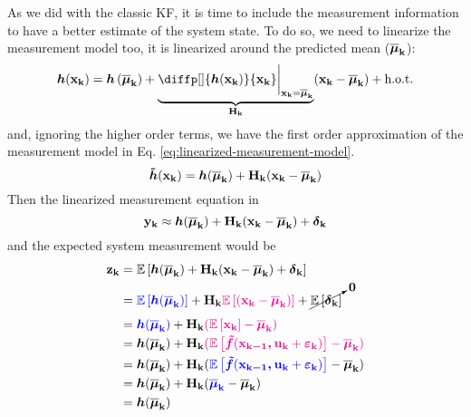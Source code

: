 \documentclass[12pt]{article}
\begin{document}
As we did with the classic KF, it is time to include the measurement information 
to have a better estimate of the system state. To do so, we need to linearize 
the measurement model too, it is linearized around the predicted mean 
($\boldsymbol{\mathbf{\overline{\mu}_k}}$):
\begin{equation*}
    \mb{h}(\bvec{x_k}) = \mb{h}\parentheses{\bvec{\overline{\mu}_k}} + 
    \underbrace{\diffp[]{\mb{h}(\bvec{x_k})}{\bvec{x_k}}
    \bigg\lvert_{\bvec{x_k}=\bvec{\overline{\mu}_k}}}_{\mat{H_k}}
    (\bvec{x_k} - \bvec{\overline{\mu}_k}) + \hot
\end{equation*}
and, ignoring the higher order terms, we have the first order approximation of the measurement model in Eq. \ref{eq:linearized-measurement-model}.
\begin{equation}
    {\boldsymbol{\tilde{h}}}(\boldsymbol{\mathbf{x_k}}) = {\boldsymbol{h}}(\boldsymbol{\mathbf{\overline{\mu}_k}}) + \boldsymbol{\mathbf{H_k}} (\boldsymbol{\mathbf{x_k}} - \boldsymbol{\mathbf{\overline{\mu}_k}})
    \label{eq:linearized-measurement-model} 
\end{equation}
Then the linearized measurement equation in
\begin{equation}
    \boldsymbol{\mathbf{y_k}} \approx {\boldsymbol{h}}(\boldsymbol{\mathbf{\overline{\mu}_k}}) + \boldsymbol{\mathbf{H_k}}(\boldsymbol{\mathbf{x_k}} - \boldsymbol{\mathbf{\overline{\mu}_k}}) + {\boldsymbol{\delta}}_\mathbf{k}
\end{equation}
and the expected system measurement would be
\begin{equation}
\begin{aligned}
    \boldsymbol{\mathbf{z_k}} &= \mathbb{E}\left[{\boldsymbol{h}}(\boldsymbol{\mathbf{\overline{\mu}_k}}) + \boldsymbol{\mathbf{H_k}}(\boldsymbol{\mathbf{x_k}} - \boldsymbol{\mathbf{\overline{\mu}_k}}) + {\boldsymbol{\delta}}_\mathbf{k}\right]\\
    &= \color{blue}\mathbb{E}\left[{\boldsymbol{h}}(\boldsymbol{\mathbf{\overline{\mu}_k}})\right]\color{black} + \boldsymbol{\mathbf{H_k}}\color{magenta}\mathbb{E}\left[(\boldsymbol{\mathbf{x_k}} - \boldsymbol{\mathbf{\overline{\mu}_k}})\right]\color{black} + \cancelto{\boldsymbol{\mathbf{0}}}{\mathbb{E}\left[{\boldsymbol{\delta}}_\mathbf{k}\right]}\\
    &= \color{blue}{\boldsymbol{h}}(\boldsymbol{\mathbf{\overline{\mu}_k}})\color{black} + \boldsymbol{\mathbf{H_k}}\color{magenta}(\mathbb{E}\left[\boldsymbol{\mathbf{x_k}}\right] - \boldsymbol{\mathbf{\overline{\mu}_k}})\color{black}\\
    &= {\boldsymbol{h}}(\boldsymbol{\mathbf{\overline{\mu}_k}}) + \boldsymbol{\mathbf{H_k}}\color{magenta}(\mathbb{E}\left[
    {\boldsymbol{\tilde{f}}}(\boldsymbol{\mathbf{x_{k-1}, u_k}} + \boldsymbol{\mathbf{\varepsilon_k}})\right] 
    - \boldsymbol{\mathbf{\overline{\mu}_k}})\color{black}\\
    &= {\boldsymbol{h}}(\boldsymbol{\mathbf{\overline{\mu}_k}}) + \boldsymbol{\mathbf{H_k}}(\color{blue}\mathbb{E}\left[
    {\boldsymbol{\tilde{f}}}(\boldsymbol{\mathbf{x_{k-1}, u_k}} + \boldsymbol{\mathbf{\varepsilon_k}})\right]\color{black} 
    - \boldsymbol{\mathbf{\overline{\mu}_k}})\\
    &= {\boldsymbol{h}}(\boldsymbol{\mathbf{\overline{\mu}_k}}) + \boldsymbol{\mathbf{H_k}}(
        \color{blue}\boldsymbol{\mathbf{\overline{\mu}_k}}\color{black} - \boldsymbol{\mathbf{\overline{\mu}_k}})\\
    &= {\boldsymbol{h}}(\boldsymbol{\mathbf{\overline{\mu}_k}}) 
\end{aligned}
\end{equation}
\end{document}
